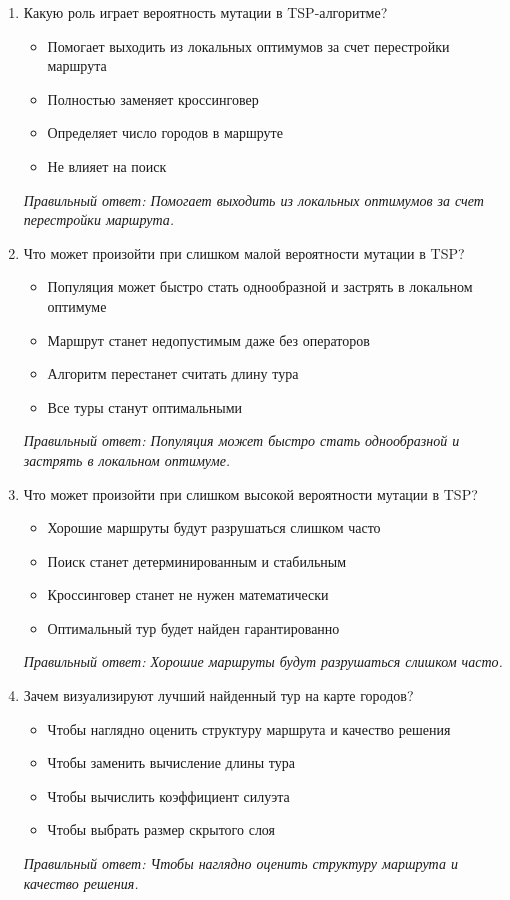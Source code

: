 \begin{enumerate}[label=\textbf{\arabic*.}, leftmargin=0pt, itemsep=1.2em]
\item Какую роль играет вероятность мутации в TSP-алгоритме?
\begin{itemize}[label=$\square$, leftmargin=1.5cm, itemsep=0.2em, topsep=0.3em]
\item Помогает выходить из локальных оптимумов за счет перестройки маршрута
\item Полностью заменяет кроссинговер
\item Определяет число городов в маршруте
\item Не влияет на поиск
\end{itemize}
{\small\textit{Правильный ответ: Помогает выходить из локальных оптимумов за счет перестройки маршрута.}}

\item Что может произойти при слишком малой вероятности мутации в TSP?
\begin{itemize}[label=$\square$, leftmargin=1.5cm, itemsep=0.2em, topsep=0.3em]
\item Популяция может быстро стать однообразной и застрять в локальном оптимуме
\item Маршрут станет недопустимым даже без операторов
\item Алгоритм перестанет считать длину тура
\item Все туры станут оптимальными
\end{itemize}
{\small\textit{Правильный ответ: Популяция может быстро стать однообразной и застрять в локальном оптимуме.}}

\item Что может произойти при слишком высокой вероятности мутации в TSP?
\begin{itemize}[label=$\square$, leftmargin=1.5cm, itemsep=0.2em, topsep=0.3em]
\item Хорошие маршруты будут разрушаться слишком часто
\item Поиск станет детерминированным и стабильным
\item Кроссинговер станет не нужен математически
\item Оптимальный тур будет найден гарантированно
\end{itemize}
{\small\textit{Правильный ответ: Хорошие маршруты будут разрушаться слишком часто.}}

\item Зачем визуализируют лучший найденный тур на карте городов?
\begin{itemize}[label=$\square$, leftmargin=1.5cm, itemsep=0.2em, topsep=0.3em]
\item Чтобы наглядно оценить структуру маршрута и качество решения
\item Чтобы заменить вычисление длины тура
\item Чтобы вычислить коэффициент силуэта
\item Чтобы выбрать размер скрытого слоя
\end{itemize}
{\small\textit{Правильный ответ: Чтобы наглядно оценить структуру маршрута и качество решения.}}


\end{enumerate}
